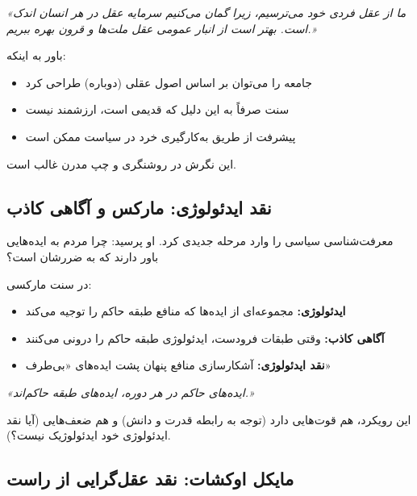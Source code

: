 \begin{quotebox}
	\textit{«ما از عقل فردی خود می‌ترسیم، زیرا گمان می‌کنیم سرمایه عقل در هر انسان اندک است. بهتر است از انبار عمومی عقل ملت‌ها و قرون بهره ببریم.»}
\end{quotebox}

\begin{defbox}
	باور به اینکه:
	\begin{itemize}[nosep]
		\item جامعه را می‌توان بر اساس اصول عقلی (دوباره) طراحی کرد
		\item سنت صرفاً به این دلیل که قدیمی است، ارزشمند نیست
		\item پیشرفت از طریق به‌کارگیری خرد در سیاست ممکن است
	\end{itemize}
	این نگرش در روشنگری و چپ مدرن غالب است.
\end{defbox}

\subsection{نقد ایدئولوژی: مارکس و آگاهی کاذب}

 معرفت‌شناسی سیاسی را وارد مرحله جدیدی کرد. او پرسید: چرا مردم به ایده‌هایی باور دارند که به ضررشان است؟

\begin{defbox}
	در سنت مارکسی:
	\begin{itemize}[nosep]
		\item \textbf{ایدئولوژی:} مجموعه‌ای از ایده‌ها که منافع طبقه حاکم را توجیه می‌کند
		\item \textbf{آگاهی کاذب:} وقتی طبقات فرودست، ایدئولوژی طبقه حاکم را درونی می‌کنند
		\item \textbf{نقد ایدئولوژی:} آشکارسازی منافع پنهان پشت ایده‌های «بی‌طرف»
	\end{itemize}
\end{defbox}

\begin{quotebox}
	\textit{«ایده‌های حاکم در هر دوره، ایده‌های طبقه حاکم‌اند.»}
\end{quotebox}

این رویکرد، هم قوت‌هایی دارد (توجه به رابطه قدرت و دانش) و هم ضعف‌هایی (آیا نقد ایدئولوژی خود ایدئولوژیک نیست؟).

\subsection{مایکل اوکشات: نقد عقل‌گرایی از راست}

